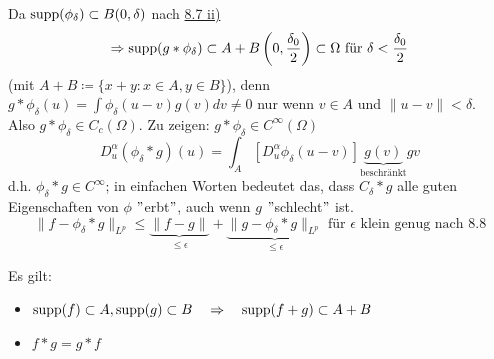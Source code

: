 \begin{kor}
\begin{beweis}
		Da $\operatorname{supp}(\phi_{\delta}) \subset B(0, \delta)$ nach \hyperref[bem:8.7ii]{8.7 ii)}
		\[ \Rightarrow \operatorname{supp}(g \ast \phi_{\delta} ) \subset A + B\left(0, \frac{\delta_{0}}{2}\right) \subset \Omega \text{ für } \delta < \frac{\delta_{0}}{2} \]
		(mit $A + B \coloneqq \{ x + y : x \in A, y \in B\}$), denn $g \ast \phi_{\delta}(u) = \int \phi_{\delta}(u - v) g(v) dv \neq 0$ nur wenn $v \in A$ und $\| u - v \| < \delta$. \\
		Also $g \ast \phi_{\delta} \in C_{c}(\Omega)$. Zu zeigen: $g \ast \phi_{\delta} \in C^{\infty}(\Omega)$
		\[ D_{u}^{\alpha}(\phi_{\delta} \ast g)(u) = \int_{A} \left[ D_{u}^{\alpha} \phi_{\delta}(u - v) \right] \underbrace{g(v)}_{\text{beschränkt}} gv \]
		d.h. $\phi_{\delta} \ast g \in C	^{\infty}$; in einfachen Worten bedeutet das, dass $C_{\delta} \ast g$ alle guten Eigenschaften von $\phi$ $"$erbt$"$, auch wenn $g$ $"$schlecht$"$ ist. \\
		\[ \| f - \phi_{\delta} \ast g \|_{L^{p}} \leq \underbrace{\| f - g \|}_{\leq \epsilon} + \underbrace{\| g - \phi_{\delta} \ast g \|_{L^{p}}}_{\leq \epsilon} \text{ für } \epsilon \text{ klein genug nach } \hyperref[satz:8.8]{8.8} \]
	\end{beweis}
\end{kor}


\begin{bemerkung*}
	Es gilt:
	\begin{itemize}
		\item $\operatorname{supp}(f) \subset A, \operatorname{supp}(g) \subset B \quad \Rightarrow  \quad \operatorname{supp}(f + g) \subset A + B $
		\item $f \ast g = g \ast f$
	\end{itemize}	
\end{bemerkung*}


